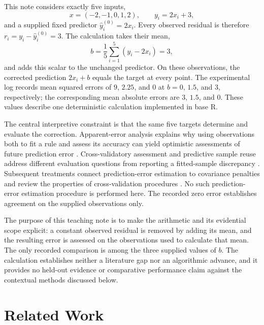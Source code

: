 \documentclass[11pt]{article}
\begin{document}
This note considers exactly five inputs,
\[
x=(-2,-1,0,1,2),
\qquad y_i=2x_i+3,
\]
and a supplied fixed predictor $\hat y_i^{(0)}=2x_i$. Every observed residual is therefore $r_i=y_i-\hat y_i^{(0)}=3$. The calculation takes their mean,
\[
b=\frac{1}{5}\sum_{i=1}^{5}(y_i-2x_i)=3,
\]
and adds this scalar to the unchanged predictor. On these observations, the corrected prediction $2x_i+b$ equals the target at every point. The experimental log records mean squared errors of $9$, $2.25$, and $0$ at $b=0$, $1.5$, and $3$, respectively; the corresponding mean absolute errors are $3$, $1.5$, and $0$. These values describe one deterministic calculation implemented in base R.

The central interpretive constraint is that the same five targets determine and evaluate the correction. Apparent-error analysis explains why using observations both to fit a rule and assess its accuracy can yield optimistic assessments of future prediction error \cite{Efron1986HowBiased}. Cross-validatory assessment and predictive sample reuse address different evaluation questions from reporting a fitted-sample discrepancy \cite{Stone1974CrossvalidatoryChoice,Geisser1975PredictiveSample}. Subsequent treatments connect prediction-error estimation to covariance penalties and review the properties of cross-validation procedures \cite{Efron2004EstimationPrediction,Arlot2010SurveyCrossvalidation}. No such prediction-error estimation procedure is performed here. The recorded zero error establishes agreement on the supplied observations only.

The purpose of this teaching note is to make the arithmetic and its evidential scope explicit: a constant observed residual is removed by adding its mean, and the resulting error is assessed on the observations used to calculate that mean. The only recorded comparison is among the three supplied values of $b$. The calculation establishes neither a literature gap nor an algorithmic advance, and it provides no held-out evidence or comparative performance claim against the contextual methods discussed below.

\section{Related Work}
\end{document}
